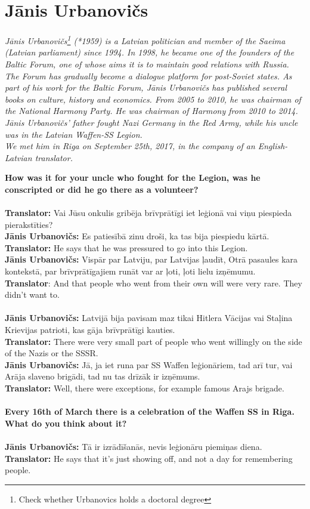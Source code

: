 \section{Jānis Urbanovičs}

\textit{Jānis Urbanovičs\footnote{Check whether Urbanovics holds a doctoral degree} (*1959) is a Latvian politician and member of the Saeima (Latvian parliament) since 1994. In 1998, he became one of the founders of the Baltic Forum, one of whose aims it is to maintain good relations with Russia. The Forum has gradually become a dialogue platform for post-Soviet states. As part of his work for the Baltic Forum, Jānis Urbanovičs has published several books on culture, history and economics. From 2005 to 2010, he was chairman of the National Harmony Party. He was chairman of Harmony from 2010 to 2014.\\
Jānis Urbanovičs’ father fought Nazi Germany in the Red Army, while his uncle was in the Latvian Waffen-SS Legion.\\
We met him in Riga on September 25th, 2017, in the company of an English-Latvian translator.}\par
\vspace*{2em}
\textbf{How was it for your uncle who fought for the Legion, was he conscripted or did he go there as a volunteer?}\\
\\
\textbf{Translator:} Vai Jūsu onkulis gribēja brīvprātīgi iet leģionā vai viņu piespieda pierakstīties?\\
\textbf{Jānis Urbanovičs:} Es patiesībā zinu droši, ka tas bija piespiedu kārtā.\\
\textbf{Translator:} He says that he was pressured to go into this Legion.\\
\textbf{Jānis Urbanovičs:} Vispār par Latviju, par Latvijas ļaudīt, Otrā pasaules kara kontekstā, par brīvprātīgajiem runāt var ar ļoti, ļoti lielu izņēmumu.\\
\textbf{Translator}: And that people who went from their own will were very rare. They didn’t want to.\\
\\
\textbf{Jānis Urbanovičs:} Latvijā bija pavisam maz tikai Hitlera Vācijas vai Staļina Krievijas patrioti, kas gāja brīvprātīgi kauties. \\
\textbf{Translator:} There were very small part of people who went willingly on the side of the Nazis or the SSSR.\\ 
\textbf{Jānis Urbanovičs:} Jā, ja iet runa par SS Waffen leģionāriem, tad arī tur, vai Arāja slaveno brigādi, tad nu tas drīzāk ir izņēmums.\\
\textbf{Translator:} Well, there were exceptions, for example famous Arajs brigade.\\
\\
\textbf{Every 16th of March there is a celebration of the Waffen SS in Riga. What do you think about it?} \\
\\
\textbf{Jānis Urbanovičs:} Tā ir izrādīšanās, nevis leģionāru piemiņas diena.\\
\textbf{Translator:} He says that it’s just showing off, and not a day for remembering people.

